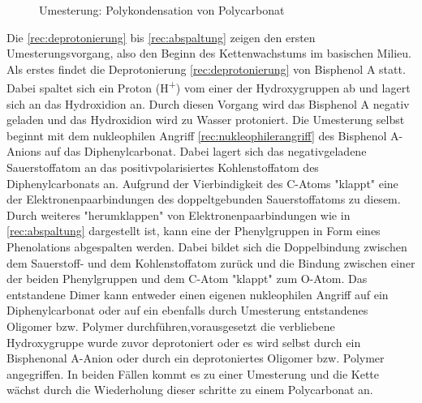 \begin{figure}[H]
    \begin{center}
        \footnotesize
        \setatomsep{1.7em}


        \vspace{10pt}

        \chemrel{->}

        \caption{Umesterung: Polykondensation von Polycarbonat}
        \label{rec:polycarbonat}
    \end{center}
\end{figure}

Die \autoref{rec:deprotonierung} bis \autoref{rec:abspaltung} zeigen den ersten
Umesterungsvorgang, also den Beginn des Kettenwachstums im basischen Milieu. Als
erstes findet die Deprotonierung \autoref{rec:deprotonierung} von Bisphenol A
statt. Dabei spaltet sich ein Proton (H\textsuperscript{+}) vom einer der
Hydroxygruppen ab und lagert sich an das Hydroxidion an. Durch diesen Vorgang
wird das Bisphenol A negativ geladen und das Hydroxidion wird zu Wasser
protoniert. Die Umesterung selbst beginnt mit dem nukleophilen Angriff
\autoref{rec:nukleophilerangriff} des Bisphenol A-Anions auf das
Diphenylcarbonat. Dabei lagert sich das negativgeladene Sauerstoffatom an das
positivpolarisiertes Kohlenstoffatom des Diphenylcarbonats an. Aufgrund der
Vierbindigkeit des C-Atoms "klappt" eine der
Elektronenpaarbindungen des doppeltgebunden Sauerstoffatoms zu diesem. Durch
weiteres "herumklappen" von
Elektronenpaarbindungen wie in \autoref{rec:abspaltung} dargestellt ist, kann
eine der Phenylgruppen in Form eines Phenolations abgespalten werden. Dabei
bildet sich die Doppelbindung zwischen dem Sauerstoff- und dem Kohlenstoffatom
zurück und die Bindung zwischen einer der beiden Phenylgruppen und dem C-Atom
"klappt" zum O-Atom. Das entstandene Dimer kann
entweder einen eigenen nukleophilen Angriff auf ein Diphenylcarbonat oder auf
ein ebenfalls durch Umesterung entstandenes Oligomer bzw. Polymer
durchführen,vorausgesetzt die verbliebene Hydroxygruppe wurde zuvor deprotoniert
oder es wird selbst durch ein Bisphenonal A-Anion oder durch ein deprotoniertes
Oligomer bzw. Polymer angegriffen. In beiden Fällen kommt es zu einer Umesterung
und die Kette wächst durch die Wiederholung dieser schritte zu einem
Polycarbonat an.

